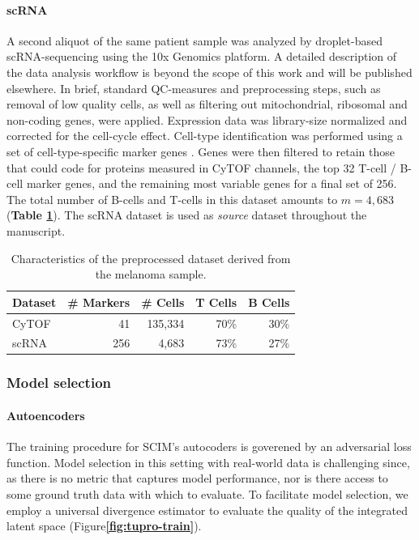 \paragraph{scRNA}
A second aliquot of the same patient sample was analyzed by droplet-based scRNA-sequencing using the 10x Genomics platform.
A detailed description of the data analysis workflow is beyond the scope of this work and will be published elsewhere.
In brief, standard QC-measures and preprocessing steps, such as removal of low quality cells, as well as filtering out mitochondrial, ribosomal and non-coding genes, were applied.
Expression data was library-size normalized and corrected for the cell-cycle effect.
Cell-type identification was performed using a set of cell-type-specific marker genes \cite{Tirosh2016}.
Genes were then filtered to retain those that could code for proteins measured in CyTOF channels, the top 32 T-cell / B-cell marker genes, and the remaining most variable genes for a final set of 256.
The total number of B-cells and T-cells in this dataset amounts to $m{=}4,683$ (\textbf{Table \ref{tbl:tupro-dataset}}).
The scRNA dataset is used as \textit{source} dataset throughout the manuscript.

\begin{table}[ht]
    \centering
    \begin{tabular}{lrrrr}
    \toprule
    Dataset &  \# Markers &  \# Cells &  T Cells &  B Cells \\
    \midrule
    CyTOF &         41 &   135,334 &       70\% &       30\% \\
    scRNA &       256 &     4,683 &       73\% &       27\% \\
    \bottomrule
    \end{tabular}
    \caption{
        Characteristics of the preprocessed dataset derived from the melanoma sample.
    }
    \label{tbl:tupro-dataset}
\end{table}

\subsubsection{Model selection}
\paragraph{Autoencoders}
The training procedure for SCIM's autocoders is goverened by an adversarial loss function.
Model selection in this setting with real-world data is challenging since, as there is no metric that captures model performance, nor is there access to some ground truth data with which to evaluate.
To facilitate model selection, we employ a universal divergence estimator \cite{Wang2009} to evaluate the quality of the integrated latent space (Figure\textbf{\ref{fig:tupro-train}}).

